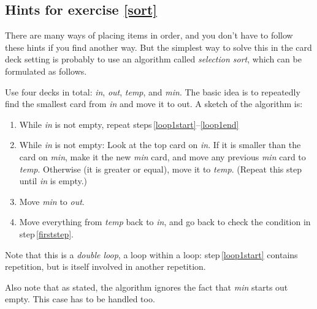 \documentclass[a4paper,twoside]{tufte-handout}
\begin{document}
 \subsection{Hints for exercise \ref{sort}}\label{sec-hints}
 
 There are many ways of placing items in order, and you don't have to
 follow these hints if you find another way. But the simplest way to
 solve this in the card deck setting is probably to use an algorithm
 called \emph{selection sort}, which can be formulated as follows.

 Use four decks in total: \emph{in}, \emph{out}, \emph{temp}, and
 \emph{min}. The basic idea is to repeatedly find the smallest card
 from \emph{in} and move it to out. A sketch of the algorithm is:

\begin{enumerate}
\item\label{firststep} While \emph{in} is not empty, repeat steps\,\ref{loop1start}--\ref{loop1end} \\
\item\label{loop1start} While \emph{in} is not empty:
  Look at the top card on \emph{in}. If it is smaller than the card on
  \emph{min}, make it the new \emph{min} card, and move any
  previous \emph{min} card to \emph{temp}. Otherwise (it is greater or
  equal), move it to \emph{temp}. (Repeat this step until \emph{in}
  is empty.)
\item Move \emph{min} to \emph{out}.
\item\label{loop1end} Move everything from \emph{temp} back to
  \emph{in}, and go back to check the condition in step\,\ref{firststep}.
\end{enumerate}

Note that this is a \emph{double loop}, a loop within a loop:
step\,\ref{loop1start} contains repetition, but is itself involved in
another repetition.

Also note that as stated, the algorithm ignores the fact that
\emph{min} starts out empty. This case has to be handled too.
\end{document}
